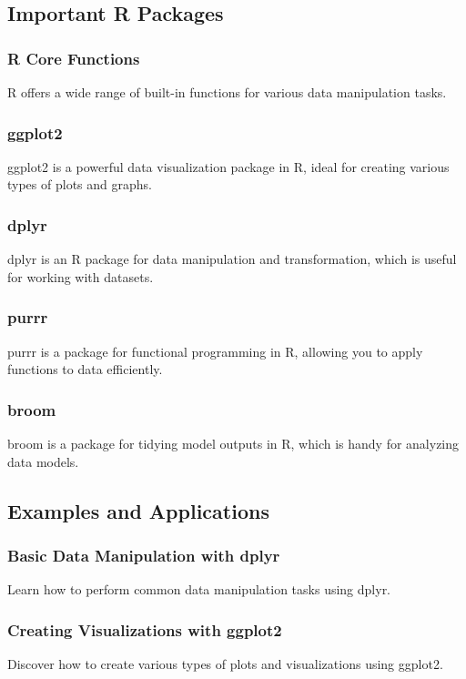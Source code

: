 \documentclass[a4paper,12pt]{book}
\begin{document}
\subsection*{Important R Packages}

\subsubsection*{R Core Functions}
R offers a wide range of built-in functions for various data manipulation tasks.

\subsubsection*{ggplot2}
ggplot2 is a powerful data visualization package in R, ideal for creating various types of plots and graphs.

\subsubsection*{dplyr}
dplyr is an R package for data manipulation and transformation, which is useful for working with datasets.

\subsubsection*{purrr}
purrr is a package for functional programming in R, allowing you to apply functions to data efficiently.

\subsubsection*{broom}
broom is a package for tidying model outputs in R, which is handy for analyzing data models.

\subsection*{Examples and Applications}

\subsubsection*{Basic Data Manipulation with dplyr}
Learn how to perform common data manipulation tasks using dplyr.

\subsubsection*{Creating Visualizations with ggplot2}
Discover how to create various types of plots and visualizations using ggplot2.
\end{document}
